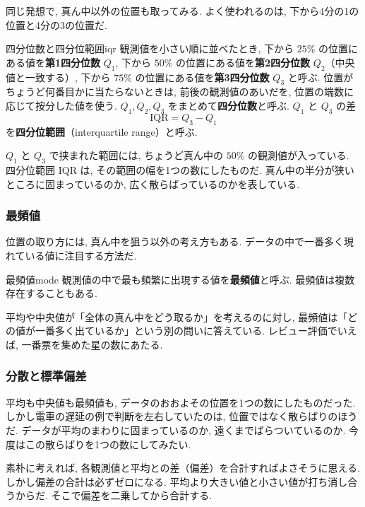     同じ発想で, 真ん中以外の位置も取ってみる.
    よく使われるのは, 下から4分の1の位置と4分の3の位置だ.

    \begin{defi}{四分位数と四分位範囲}{iqr}
      観測値を小さい順に並べたとき, 下から $25\%$ の位置にある値を\textbf{第1四分位数} $Q_1$,
      下から $50\%$ の位置にある値を\textbf{第2四分位数} $Q_2$（中央値と一致する）,
      下から $75\%$ の位置にある値を\textbf{第3四分位数} $Q_3$ と呼ぶ.
      位置がちょうど何番目かに当たらないときは, 前後の観測値のあいだを, 位置の端数に応じて按分した値を使う.
      $Q_1, Q_2, Q_3$ をまとめて\textbf{四分位数}と呼ぶ.
      $Q_1$ と $Q_3$ の差
      \[
        \mathrm{IQR} = Q_3 - Q_1
      \]
      を\textbf{四分位範囲}（interquartile range）と呼ぶ.
    \end{defi}

    $Q_1$ と $Q_3$ で挟まれた範囲には, ちょうど真ん中の $50\%$ の観測値が入っている.
    四分位範囲 $\mathrm{IQR}$ は, その範囲の幅を1つの数にしたものだ.
    真ん中の半分が狭いところに固まっているのか, 広く散らばっているのかを表している.

    \subsubsection*{最頻値}

    位置の取り方には, 真ん中を狙う以外の考え方もある.
    データの中で一番多く現れている値に注目する方法だ.

    \begin{defi}{最頻値}{mode}
      観測値の中で最も頻繁に出現する値を\textbf{最頻値}と呼ぶ.
      最頻値は複数存在することもある.
    \end{defi}

    平均や中央値が「全体の真ん中をどう取るか」を考えるのに対し, 最頻値は「どの値が一番多く出ているか」という別の問いに答えている.
    レビュー評価でいえば, 一番票を集めた星の数にあたる.

    \subsubsection*{分散と標準偏差}

    平均も中央値も最頻値も, データのおおよその位置を1つの数にしたものだった.
    しかし電車の遅延の例で判断を左右していたのは, 位置ではなく散らばりのほうだ.
    データが平均のまわりに固まっているのか, 遠くまでばらついているのか.
    今度はこの散らばりを1つの数にしてみたい.

    素朴に考えれば, 各観測値と平均との差（偏差）を合計すればよさそうに思える.
    しかし偏差の合計は必ずゼロになる.
    平均より大きい値と小さい値が打ち消し合うからだ.
    そこで偏差を二乗してから合計する.


